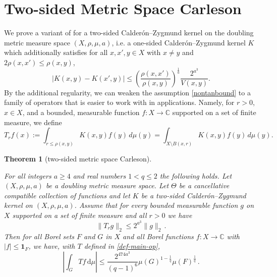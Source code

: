 \documentclass[10pt,a4paper]{article}
\theoremstyle{plain}
\newtheorem{theorem}{Theorem}[subsection]
\theoremstyle{definition}
\numberwithin{equation}{subsection}
\newcommand{\Mf}{{\Theta}}
\newcommand{\lean}[1]{}
\newcommand{\uses}[1]{}
\newcommand{\leanok}{}
\def\C{\mathbb{C}}
\begin{document}
\section{Two-sided Metric Space Carleson}

We prove a variant of  for a two-sided Calder\'on--Zygmund kernel on the doubling metric measure space $(X,\rho,\mu,a)$, i.e. a one-sided Calder\'on--Zygmund kernel $K$ which additionally satisfies for all $x,x',y\in X$ with $x\neq y$ and $2\rho(x,x') \leq \rho(x,y)$,
\begin{equation}
    \label{eqkernel-x-smooth}
    |K(x,y) - K(x',y)| \leq \left(\frac{\rho(x,x')}{\rho(x,y)}\right)^{\frac{1}{a}}\frac{2^{a^3}}{V(x,y)}.
\end{equation}
By the additional regularity, we can weaken the assumption \eqref{nontanbound} to a family of operators that is easier to work with in applications.
Namely, for $r > 0$, $x\in X$, and a bounded, measurable function $f:X\to\C$ supported on a set of finite measure, we define
\begin{equation}
\label{def-T-r}
T_r f(x):= \int_{r\le\rho(x,y)} K(x,y) f(y) \, d\mu(y) = \int_{X\setminus B(x,r)} K(x,y) f(y) \, d\mu(y).
\end{equation}
\begin{theorem}[two-sided metric space Carleson]
    \label{two-sided-metric-space-Carleson}
    \uses{metric-space-Carleson, nontangential-from-simple}
    \leanok
    \lean{two_sided_metric_carleson}
        For all  integers $a \ge  4$ and real numbers $1<q\le 2$
        the following holds.
        Let $(X,\rho,\mu,a)$ be a doubling metric measure space. Let  $\Mf$ be a
        cancellative compatible  collection of functions and let $K$ be a two-sided Calder\'on--Zygmund kernel on $(X,\rho,\mu,a)$. Assume  that for every bounded measurable function $g$ on $X$ supported on a set of finite measure and all $r>0$ we have
      \begin{equation}\label{two-sided-Hr-bound-assumption}
            \|T_r g\|_{2} \leq 2^{a^3} \|g\|_2\,.
        \end{equation}
        Then for all Borel sets $F$ and $G$ in $X$ and
        all Borel functions $f:X\to \C$ with
        $|f|\le \mathbf{1}_F$, we have, with $T$ defined in \eqref{def-main-op},
      \begin{equation}
        \label{two-sided-resweak}
            \left|\int_{G} T f \, \mathrm{d}\mu\right| \leq \frac{2^{474a^3}}{(q-1)^6} \mu(G)^{1-\frac{1}{q}} \mu(F)^{\frac{1}{q}}\, .
        \end{equation}
\end{theorem}
\end{document}
